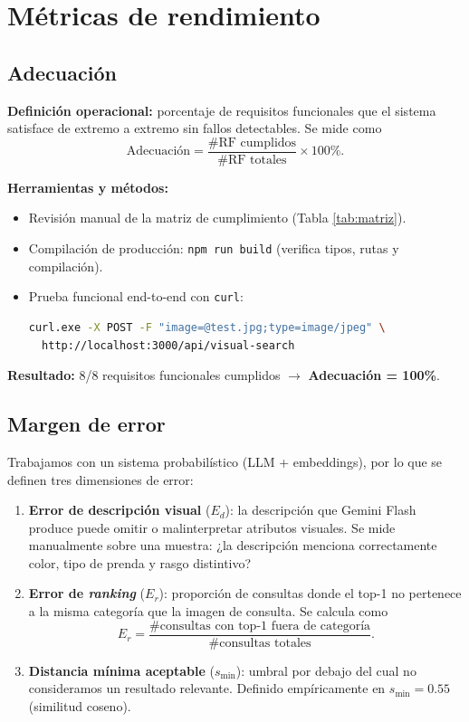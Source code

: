 \documentclass[11pt,letterpaper]{article}
\begin{document}
\section{Métricas de rendimiento}\label{sec:metricas}

\subsection{Adecuación}

\textbf{Definición operacional:} porcentaje de requisitos funcionales que el sistema satisface de extremo a extremo sin fallos detectables. Se mide como
\[
\text{Adecuación} = \frac{\#\text{RF cumplidos}}{\#\text{RF totales}} \times 100\%.
\]

\textbf{Herramientas y métodos:}
\begin{itemize}[leftmargin=*]
  \item Revisión manual de la matriz de cumplimiento (Tabla \ref{tab:matriz}).
  \item Compilación de producción: \texttt{npm run build} (verifica tipos, rutas y compilación).
  \item Prueba funcional end-to-end con \texttt{curl}:
\begin{lstlisting}[language=bash]
curl.exe -X POST -F "image=@test.jpg;type=image/jpeg" \
  http://localhost:3000/api/visual-search
\end{lstlisting}
\end{itemize}

\textbf{Resultado:} 8/8 requisitos funcionales cumplidos $\rightarrow$ \textbf{Adecuación = 100\%}.

\subsection{Margen de error}

Trabajamos con un sistema probabilístico (LLM + embeddings), por lo que se definen tres dimensiones de error:

\begin{enumerate}[leftmargin=*]
  \item \textbf{Error de descripción visual} ($E_d$): la descripción que Gemini Flash produce puede omitir o malinterpretar atributos visuales. Se mide manualmente sobre una muestra: ¿la descripción menciona correctamente color, tipo de prenda y rasgo distintivo?
  \item \textbf{Error de \textit{ranking}} ($E_r$): proporción de consultas donde el top-1 no pertenece a la misma categoría que la imagen de consulta. Se calcula como
  \[
    E_r = \frac{\#\text{consultas con top-1 fuera de categoría}}{\#\text{consultas totales}}.
  \]
  \item \textbf{Distancia mínima aceptable} ($s_{\min}$): umbral por debajo del cual no consideramos un resultado relevante. Definido empíricamente en $s_{\min} = 0.55$ (similitud coseno).
\end{enumerate}
\end{document}
